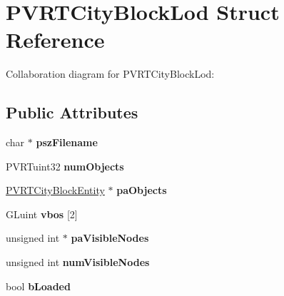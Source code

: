 \hypertarget{struct_p_v_r_t_city_block_lod}{\section{P\+V\+R\+T\+City\+Block\+Lod Struct Reference}
\label{struct_p_v_r_t_city_block_lod}
}


Collaboration diagram for P\+V\+R\+T\+City\+Block\+Lod\+:
\subsection*{Public Attributes}
\begin{DoxyCompactItemize}
\item 
\hypertarget{struct_p_v_r_t_city_block_lod_aff425a75d41b59c4bdd333a7b45e8d1d}{char $\ast$ {\bfseries psz\+Filename}}\label{struct_p_v_r_t_city_block_lod_aff425a75d41b59c4bdd333a7b45e8d1d}

\item 
\hypertarget{struct_p_v_r_t_city_block_lod_a20b46ea74da0fe409e1cc0802fb07971}{P\+V\+R\+Tuint32 {\bfseries num\+Objects}}\label{struct_p_v_r_t_city_block_lod_a20b46ea74da0fe409e1cc0802fb07971}

\item 
\hypertarget{struct_p_v_r_t_city_block_lod_ab848c6bec3ebb32edc0cb785f1458614}{\hyperlink{struct_p_v_r_t_city_block_entity}{P\+V\+R\+T\+City\+Block\+Entity} $\ast$ {\bfseries pa\+Objects}}\label{struct_p_v_r_t_city_block_lod_ab848c6bec3ebb32edc0cb785f1458614}

\item 
\hypertarget{struct_p_v_r_t_city_block_lod_a99f484699f1a93656f25b6445a30f478}{G\+Luint {\bfseries vbos} \mbox{[}2\mbox{]}}\label{struct_p_v_r_t_city_block_lod_a99f484699f1a93656f25b6445a30f478}

\item 
\hypertarget{struct_p_v_r_t_city_block_lod_aa36e3bbcff7269bab99cebe32566cc01}{unsigned int $\ast$ {\bfseries pa\+Visible\+Nodes}}\label{struct_p_v_r_t_city_block_lod_aa36e3bbcff7269bab99cebe32566cc01}

\item 
\hypertarget{struct_p_v_r_t_city_block_lod_a7118024bb4a6b8f59e7cf1d242ad0dfe}{unsigned int {\bfseries num\+Visible\+Nodes}}\label{struct_p_v_r_t_city_block_lod_a7118024bb4a6b8f59e7cf1d242ad0dfe}

\item 
\hypertarget{struct_p_v_r_t_city_block_lod_a16af07cbf36e30e0eafeb72878212552}{bool {\bfseries b\+Loaded}}\label{struct_p_v_r_t_city_block_lod_a16af07cbf36e30e0eafeb72878212552}

\end{DoxyCompactItemize}


